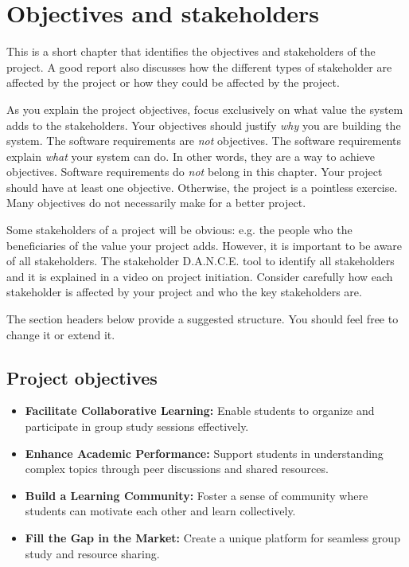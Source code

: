 \chapter{Objectives and stakeholders}
\label{sect:objectives}

\begin{expectations}
This is a short chapter that identifies the objectives and stakeholders of the project.  A good report also discusses how the different types of stakeholder are affected by the project or how they could be affected by the project.

As you explain the project objectives, focus exclusively on what value the system adds to the stakeholders.  Your objectives should justify \emph{why} you are building the system.  The software requirements are \emph{not} objectives.  The software requirements explain \emph{what} your system can do.  In other words, they are a way to achieve objectives.  Software requirements do \emph{not} belong in this chapter.  Your project should have at least one objective.  Otherwise, the project is a pointless exercise.  Many objectives do not necessarily make for a better project.

Some stakeholders of a project will be obvious: e.g. the people who the beneficiaries of the value your project adds.  However, it is important to be aware of all stakeholders.  The stakeholder D.A.N.C.E. tool to identify all stakeholders and it is explained in a video on project initiation.  Consider carefully how each stakeholder is affected by your project and who the key stakeholders are.

The section headers below provide a suggested structure.  You should feel free to change it or extend it.
\end{expectations}

\section{Project objectives}
\label{sect:objectives}

\begin{itemize}
    \item \textbf{Facilitate Collaborative Learning:} Enable students to organize and participate in group study sessions effectively.
    \item \textbf{Enhance Academic Performance:} Support students in understanding complex topics through peer discussions and shared resources.
    \item \textbf{Build a Learning Community:} Foster a sense of community where students can motivate each other and learn collectively.
    \item \textbf{Fill the Gap in the Market:} Create a unique platform for seamless group study and resource sharing.
\end{itemize}

